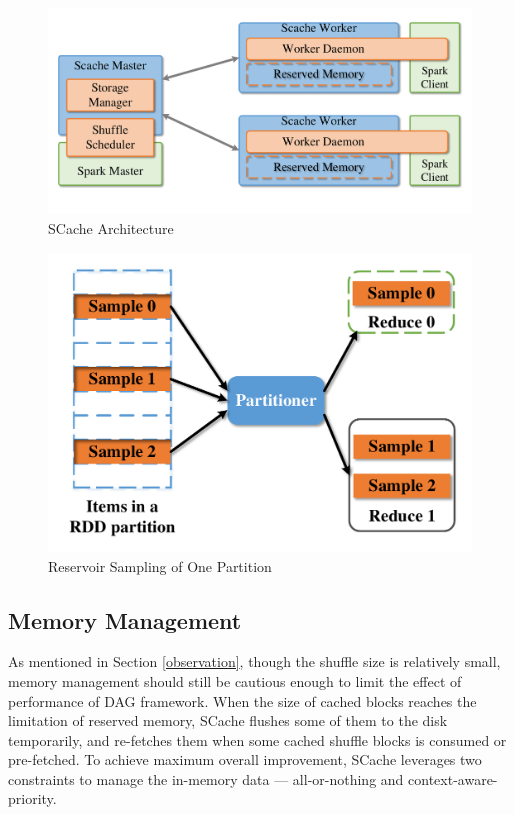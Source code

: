 \begin{figure}
	\centering
	\includegraphics[width=0.8\linewidth]{fig/arch}
	\caption{SCache Architecture}
	\label{fig:arch}
\end{figure}
\begin{figure}
	\centering
	\includegraphics[width=0.6\linewidth]{fig/sample}
	\caption{Reservoir Sampling of One Partition}
	\label{fig:sample}
\end{figure}

\subsection{Memory Management}\label{memorymanage}
As mentioned in Section \ref{observation}, though the shuffle size is relatively small, memory management should still be cautious enough to limit the effect of performance of DAG framework.
When the size of cached blocks reaches the limitation of reserved memory, SCache flushes some of them to the disk temporarily, and re-fetches them when some cached shuffle blocks is consumed or pre-fetched. To achieve maximum overall improvement, SCache leverages two constraints to manage the in-memory data --- all-or-nothing and context-aware-priority.

